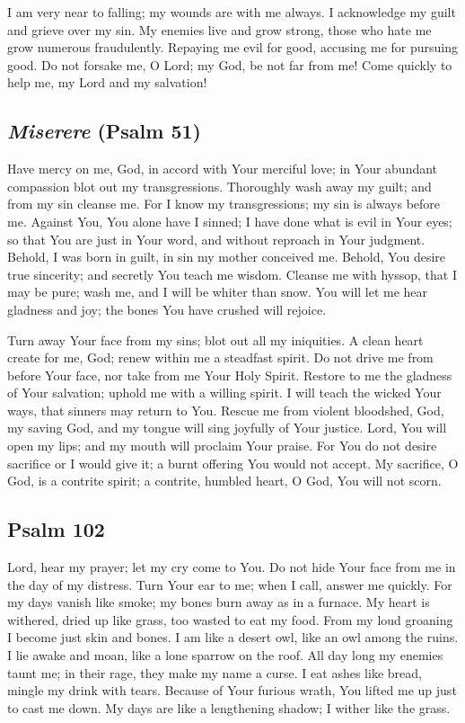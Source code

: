 \documentclass[12pt]{article}
\newcommand{\prayertitle}[1]{\subsection{#1}}
\newcommand{\indulgencedprayertitle}[1]{\prayertitle{#1 \protect\kreuz}}
\newcommand{\foreign}[1]{\textsl{#1}}
\begin{document}
I am very near to falling;
my wounds are with me always.
I acknowledge my guilt
and grieve over my sin.
My enemies live and grow strong, those who hate me grow numerous fraudulently.
Repaying me evil for good,
accusing me for pursuing good.
Do not forsake me, O Lord;
my God, be not far from me!
Come quickly to help me, my Lord and my salvation!

\indulgencedprayertitle{\foreign{Miserere} (Psalm 51)}
Have mercy on me, God, in accord with Your merciful love;
in Your abundant compassion blot out my transgressions.
Thoroughly wash away my guilt;
and from my sin cleanse me.
For I know my transgressions;
my sin is always before me.
Against You, You alone have I sinned;
I have done what is evil in Your eyes;
so that You are just in Your word, and without reproach in Your judgment.
Behold, I was born in guilt, in sin my mother conceived me.
Behold, You desire true sincerity;
and secretly You teach me wisdom.
Cleanse me with hyssop, that I may be pure;
wash me, and I will be whiter than snow.
You will let me hear gladness and joy;
the bones You have crushed will rejoice.

Turn away Your face from my sins;
blot out all my iniquities.
A clean heart create for me, God;
renew within me a steadfast spirit.
Do not drive me from before Your face, nor take from me Your Holy Spirit.
Restore to me the gladness of Your salvation;
uphold me with a willing spirit.
I will teach the wicked Your ways, that sinners may return to You.
Rescue me from violent bloodshed, God, my saving God, and my tongue will sing joyfully of Your justice.
Lord, You will open my lips;
and my mouth will proclaim Your praise.
For You do not desire sacrifice or I would give it;
a burnt offering You would not accept.
My sacrifice, O God, is a contrite spirit;
a contrite, humbled heart, O God, You will not scorn.

\indulgencedprayertitle{Psalm 102}
Lord, hear my prayer;
let my cry come to You.
Do not hide Your face from me in the day of my distress.
Turn Your ear to me;
when I call, answer me quickly.
For my days vanish like smoke;
my bones burn away as in a furnace.
My heart is withered, dried up like grass, too wasted to eat my food.
From my loud groaning I become just skin and bones.
I am like a desert owl, like an owl among the ruins.
I lie awake and moan, like a lone sparrow on the roof.
All day long my enemies taunt me;
in their rage, they make my name a curse.
I eat ashes like bread, mingle my drink with tears.
Because of Your furious wrath, You lifted me up just to cast me down.
My days are like a lengthening shadow;
I wither like the grass.
\end{document}
